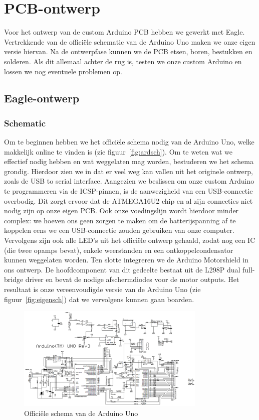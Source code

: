 \section{PCB-ontwerp}
Voor het ontwerp van de custom Arduino PCB hebben we gewerkt met Eagle. Vertrekkende van de offici\"{e}le schematic van de Arduino Uno maken we onze eigen versie hiervan. Na de ontwerpfase kunnen we de PCB etsen, boren, bestukken en solderen. Als dit allemaal achter de rug is, testen we onze custom Arduino en lossen we nog eventuele problemen op. 
\subsection{Eagle-ontwerp}
\subsubsection{Schematic}
Om te beginnen hebben we het offici\"{e}le schema nodig van de Arduino Uno, welke makkelijk online te vinden is (zie figuur~\vref{fig:ardsch}). Om te weten wat we effectief nodig hebben en wat weggelaten mag worden, bestuderen we het schema grondig. Hierdoor zien we in dat er veel weg kan vallen uit het originele ontwerp, zoals de USB to serial interface. Aangezien we beslissen om onze custom Arduino te programmeren via de ICSP-pinnen, is de aanwezigheid van een USB-connectie overbodig. Dit zorgt ervoor dat de ATMEGA16U2 chip en al zijn connecties niet nodig zijn op onze eigen PCB. Ook onze voedingslijn wordt hierdoor minder complex: we hoeven ons geen zorgen te maken om de batterijspanning af te koppelen eens we een USB-connectie zouden gebruiken van onze computer. Vervolgens zijn ook alle LED's uit het offici\"{e}le ontwerp gehaald, zodat nog een IC (die twee opamps bevat), enkele weerstanden en een ontkoppelcondensator kunnen weggelaten worden. Ten slotte integreren we de Arduino Motorshield in ons ontwerp. De hoofdcomponent van dit gedeelte bestaat uit de L298P dual full-bridge driver en bevat de nodige afschermdiodes voor de motor outputs. Het resultaat is onze vereenvoudigde versie van de Arduino Uno (zie figuur~\vref{fig:eigensch}) dat we vervolgens kunnen gaan boarden.

\begin{figure}[H]
	\centering
	\includegraphics[height=5cm]{arduino-uno-r3-schematic.png}
	\caption{Offici\"{e}le schema van de Arduino Uno\label{fig:ardsch}}
\end{figure}

